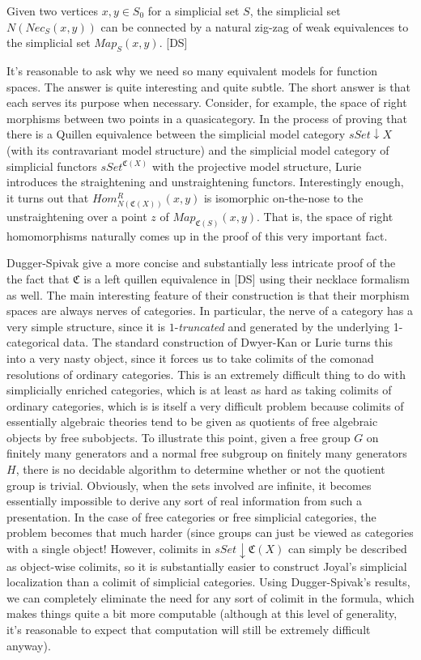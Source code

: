 \documentclass{amsart}
\begin{document}
\begin{thm}
Given two vertices $x,y\in S_0$ for a simplicial set $S$, the simplicial set $N(Nec_{S}(x,y))$ can be connected by a natural zig-zag of weak equivalences to the simplicial set $Map_S(x,y)$. [DS]
\end{thm}
  
It's reasonable to ask why we need so many equivalent models for function spaces.  The answer is quite interesting and quite subtle.  The short answer is that each serves its purpose when necessary.  Consider, for example, the space of right morphisms between two points in a quasicategory.  In the process of proving that there is a Quillen equivalence between the simplicial model category $sSet\downarrow X$ (with its contravariant model structure) and the simplicial model category of simplicial functors $sSet^{\mathfrak{C}(X)}$ with the projective model structure, Lurie introduces the straightening and unstraightening functors.  Interestingly enough, it turns out that $Hom^R_{N(\mathfrak{C}(X))}(x,y)$ is isomorphic on-the-nose to the unstraightening over a point $z$ of $Map_{\mathfrak{C}(S)}(x,y)$.  That is, the space of right homomorphisms naturally comes up in the proof of this very important fact.

Dugger-Spivak give a more concise and substantially less intricate proof of the the fact that $\mathfrak{C}$ is a left quillen equivalence in [DS] using their necklace formalism as well.  The main interesting feature of their construction is that their morphism spaces are always nerves of categories.  In particular, the nerve of a category has a very simple structure, since it is $1$-\emph{truncated} and generated by the underlying 1-categorical data. The standard construction of Dwyer-Kan or Lurie turns this into a very nasty object, since it forces us to take colimits of the comonad resolutions of ordinary categories.  This is an extremely difficult thing to do with simplicially enriched categories, which is at least as hard as taking colimits of ordinary categories, which is is itself a very difficult problem because colimits of essentially algebraic theories tend to be given as quotients of free algebraic objects by free subobjects. To illustrate this point, given a free group $G$ on finitely many generators and a normal free subgroup on finitely many generators $H$, there is no decidable algorithm to determine whether or not the quotient group is trivial.  Obviously, when the sets involved are infinite, it becomes essentially impossible to derive any sort of real information from such a presentation.  In the  case of free categories or free simplicial categories, the problem becomes that much harder (since groups can just be viewed as categories with a single object! However, colimits in $sSet\downarrow\mathfrak{C}(X)$ can simply be described as object-wise colimits, so it is substantially easier to construct Joyal's simplicial localization than a colimit of simplicial categories.    Using Dugger-Spivak's results, we can completely eliminate the need for any sort of colimit in the formula, which makes things quite a bit more computable (although at this level of generality, it's reasonable to expect that computation will still be extremely difficult anyway).  
\end{document}
